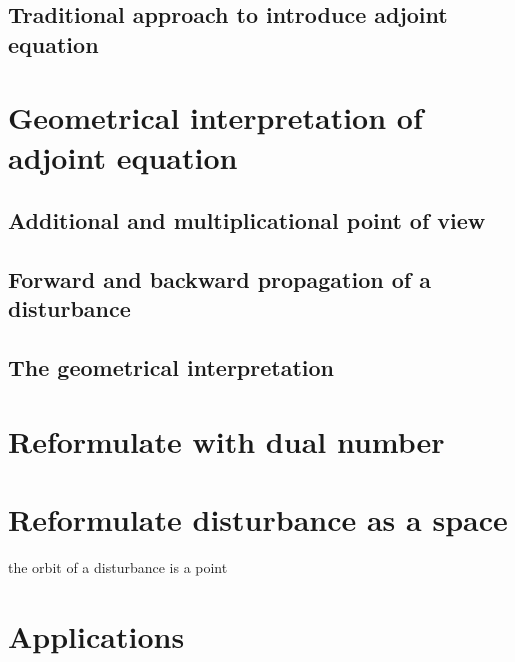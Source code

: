 \documentclass{article}
\begin{document}
\subsection{Traditional approach to introduce adjoint equation}


\section{Geometrical interpretation of adjoint equation}

\subsection{Additional and multiplicational point of view}

\subsection{Forward and backward propagation of a disturbance}

\subsection{The geometrical interpretation}

\section{Reformulate with dual number}

\section{Reformulate disturbance as a space}

the orbit of a disturbance is a point

\section{Applications}



\end{document}
